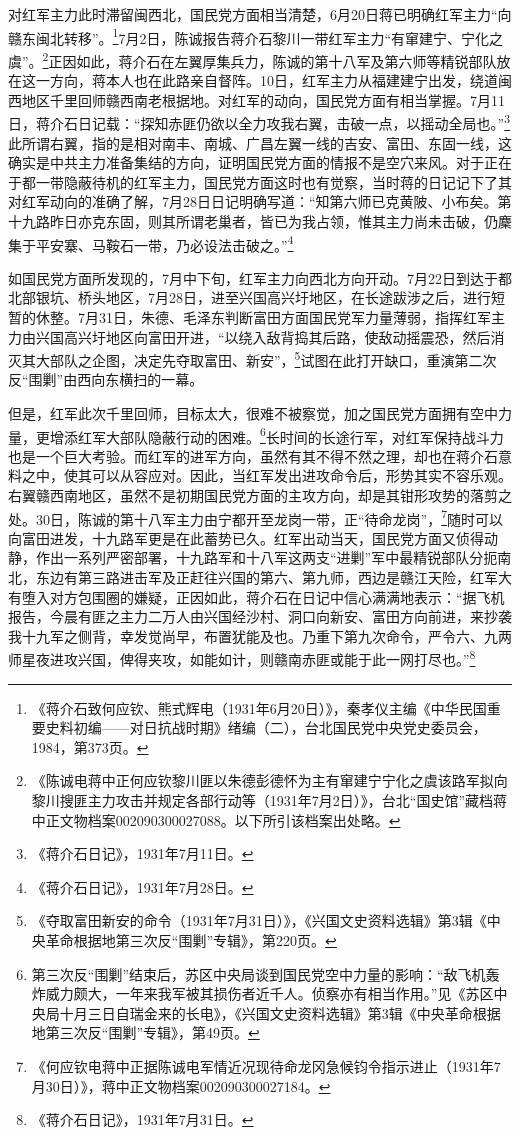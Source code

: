 对红军主力此时滞留闽西北，国民党方面相当清楚，6月20日蒋已明确红军主力“向赣东闽北转移”。\footnote{《蒋介石致何应钦、熊式辉电（1931年6月20日）》，秦孝仪主编《中华民国重要史料初编——对日抗战时期》绪编（二），台北国民党中央党史委员会，1984，第373页。}7月2日，陈诚报告蒋介石黎川一带红军主力“有窜建宁、宁化之虞”。\footnote{《陈诚电蒋中正何应钦黎川匪以朱德彭德怀为主有窜建宁宁化之虞该路军拟向黎川搜匪主力攻击并规定各部行动等（1931年7月2日）》，台北“国史馆”藏档蒋中正文物档案002090300027088。以下所引该档案出处略。}正因如此，蒋介石在左翼厚集兵力，陈诚的第十八军及第六师等精锐部队放在这一方向，蒋本人也在此路亲自督阵。10日，红军主力从福建建宁出发，绕道闽西地区千里回师赣西南老根据地。对红军的动向，国民党方面有相当掌握。7月11日，蒋介石日记载：“探知赤匪仍欲以全力攻我右翼，击破一点，以摇动全局也。”\footnote{《蒋介石日记》，1931年7月11日。}此所谓右翼，指的是相对南丰、南城、广昌左翼一线的吉安、富田、东固一线，这确实是中共主力准备集结的方向，证明国民党方面的情报不是空穴来风。对于正在于都一带隐蔽待机的红军主力，国民党方面这时也有觉察，当时蒋的日记记下了其对红军动向的准确了解，7月28日日记明确写道：“知第六师已克黄陂、小布矣。第十九路昨日亦克东固，则其所谓老巢者，皆已为我占领，惟其主力尚未击破，仍麇集于平安寨、马鞍石一带，乃必设法击破之。”\footnote{《蒋介石日记》，1931年7月28日。}


如国民党方面所发现的，7月中下旬，红军主力向西北方向开动。7月22日到达于都北部银坑、桥头地区，7月28日，进至兴国高兴圩地区，在长途跋涉之后，进行短暂的休整。7月31日，朱德、毛泽东判断富田方面国民党军力量薄弱，指挥红军主力由兴国高兴圩地区向富田开进，“以绕入敌背捣其后路，使敌动摇震恐，然后消灭其大部队之企图，决定先夺取富田、新安”，\footnote{《夺取富田新安的命令（1931年7月31日）》，《兴国文史资料选辑》第3辑《中央革命根据地第三次反“围剿”专辑》，第220页。}试图在此打开缺口，重演第二次反“围剿”由西向东横扫的一幕。


但是，红军此次千里回师，目标太大，很难不被察觉，加之国民党方面拥有空中力量，更增添红军大部队隐蔽行动的困难。\footnote{第三次反“围剿”结束后，苏区中央局谈到国民党空中力量的影响：“敌飞机轰炸威力颇大，一年来我军被其损伤者近千人。侦察亦有相当作用。”见《苏区中央局十月三日自瑞金来的长电》，《兴国文史资料选辑》第3辑《中央革命根据地第三次反“围剿”专辑》，第49页。}长时间的长途行军，对红军保持战斗力也是一个巨大考验。而红军的进军方向，虽然有其不得不然之理，却也在蒋介石意料之中，使其可以从容应对。因此，当红军发出进攻命令后，形势其实不容乐观。右翼赣西南地区，虽然不是初期国民党方面的主攻方向，却是其钳形攻势的落剪之处。30日，陈诚的第十八军主力由宁都开至龙岗一带，正“待命龙岗”，\footnote{《何应钦电蒋中正据陈诚电军情近况现待命龙冈急候钧令指示进止（1931年7月30日）》，蒋中正文物档案002090300027184。}随时可以向富田进发，十九路军更是在此蓄势已久。红军出动当天，国民党方面又侦得动静，作出一系列严密部署，十九路军和十八军这两支“进剿”军中最精锐部队分扼南北，东边有第三路进击军及正赶往兴国的第六、第九师，西边是赣江天险，红军大有堕入对方包围圈的嫌疑，正因如此，蒋介石在日记中信心满满地表示：“据飞机报告，今晨有匪之主力二万人由兴国经沙村、洞口向新安、富田方向前进，来抄袭我十九军之侧背，幸发觉尚早，布置犹能及也。乃重下第九次命令，严令六、九两师星夜进攻兴国，俾得夹攻，如能如计，则赣南赤匪或能于此一网打尽也。”\footnote{《蒋介石日记》，1931年7月31日。}


